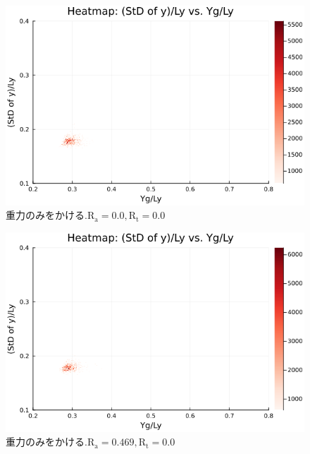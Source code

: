 
\begin{figure}[H]
  \centering
  \includegraphics[scale=0.6]{image/dT0_heat/2024-01-15T14:30:46.366_mapg0_chi0_Ay50_rho0.4_T0.43_dT0.0_Rd0.0_Rt0.0_Ra0.0_g0.0003999718779659611_run4.0e7.png}
  \caption{$重力のみをかける. \text{R}_\text{a}=0.0,\text{R}_\text{t}=0.0$}
\end{figure}

\begin{figure}[H]
  \centering
  \includegraphics[scale=0.6]{image/dT0_heat/2024-01-15T14:30:46.901_mapg0_chi0_Ay50_rho0.4_T0.43_dT0.0_Rd0.0_Rt0.0_Ra0.4693845_g0.0003999718779659611_run4.0e7.png}
  \caption{$重力のみをかける. \text{R}_\text{a}=0.469,\text{R}_\text{t}=0.0$}
  \label{}
\end{figure}

